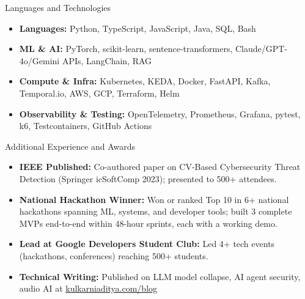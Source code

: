 \documentclass[]{mcdowellcv}
\begin{document}
\begin{cvsection}{Languages and Technologies}
  \begin{cvsubsection}{}{}{}
    \begin{itemize}
      \item \textbf{Languages:} Python, TypeScript, JavaScript, Java, SQL, Bash
      \item \textbf{ML \& AI:} PyTorch, scikit-learn, sentence-transformers, Claude/GPT-4o/Gemini APIs, LangChain, RAG
      \item \textbf{Compute \& Infra:} Kubernetes, KEDA, Docker, FastAPI, Kafka, Temporal.io, AWS, GCP, Terraform, Helm
      \item \textbf{Observability \& Testing:} OpenTelemetry, Prometheus, Grafana, pytest, k6, Testcontainers, GitHub Actions
    \end{itemize}
  \end{cvsubsection}
\end{cvsection}

\begin{cvsection}{Additional Experience and Awards}
  \begin{cvsubsection}{}{}{}
    \begin{itemize}
      \item \textbf{IEEE Published:} Co-authored paper on CV-Based Cybersecurity Threat Detection (Springer icSoftComp 2023); presented to 500+ attendees.
      \item \textbf{National Hackathon Winner:} Won or ranked Top 10 in 6+ national hackathons spanning ML, systems, and developer tools; built 3 complete MVPs end-to-end within 48-hour sprints, each with a working demo.
      \item \textbf{Lead at Google Developers Student Club:} Led 4+ tech events (hackathons, conferences) reaching 500+ students.
      \item \textbf{Technical Writing:} Published on LLM model collapse, AI agent security, audio AI at \href{https://www.kulkarniaditya.com/blog}{kulkarniaditya.com/blog}
    \end{itemize}
  \end{cvsubsection}
\end{cvsection}
\end{document}

